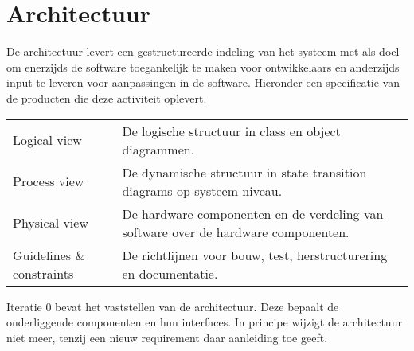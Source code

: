 
\section{Architectuur}

De architectuur levert een gestructureerde indeling van het systeem met als doel om enerzijds de software
toegankelijk te maken voor ontwikkelaars en anderzijds input te leveren voor aanpassingen in de software. Hieronder
een specificatie van de producten die deze activiteit oplevert.

{\tiny
\begin{center}
\begin{tabular}{lp{30em}}
Logical view & De logische structuur in class en object diagrammen.\\
Process view & De dynamische structuur in state
transition diagrams op systeem niveau.\\
Physical view &  De hardware componenten en de verdeling van
software over de hardware componenten.\\
Guidelines \& constraints & De richtlijnen voor bouw,
test, herstructurering en documentatie.\\
\end{tabular}
\end{center}
}

Iteratie 0 bevat het vaststellen van de architectuur. Deze bepaalt de onderliggende componenten en hun interfaces.
In principe wijzigt de architectuur niet meer, tenzij een nieuw requirement daar aanleiding toe geeft.